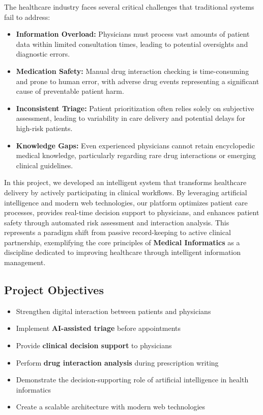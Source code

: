 \documentclass[12pt,a4paper]{article}
\begin{document}
The healthcare industry faces several critical challenges that traditional systems fail to address:
\begin{itemize}
    \item \textbf{Information Overload:} Physicians must process vast amounts of patient data within limited consultation times, leading to potential oversights and diagnostic errors.
    \item \textbf{Medication Safety:} Manual drug interaction checking is time-consuming and prone to human error, with adverse drug events representing a significant cause of preventable patient harm.
    \item \textbf{Inconsistent Triage:} Patient prioritization often relies solely on subjective assessment, leading to variability in care delivery and potential delays for high-risk patients.
    \item \textbf{Knowledge Gaps:} Even experienced physicians cannot retain encyclopedic medical knowledge, particularly regarding rare drug interactions or emerging clinical guidelines.
\end{itemize}

In this project, we developed an intelligent system that transforms healthcare delivery by actively participating in clinical workflows. By leveraging artificial intelligence and modern web technologies, our platform optimizes patient care processes, provides real-time decision support to physicians, and enhances patient safety through automated risk assessment and interaction analysis. This represents a paradigm shift from passive record-keeping to active clinical partnership, exemplifying the core principles of \textbf{Medical Informatics} as a discipline dedicated to improving healthcare through intelligent information management.

\subsection{Project Objectives}
\begin{itemize}[leftmargin=2cm]
    \item Strengthen digital interaction between patients and physicians
    \item Implement \textbf{AI-assisted triage} before appointments
    \item Provide \textbf{clinical decision support} to physicians
    \item Perform \textbf{drug interaction analysis} during prescription writing
    \item Demonstrate the decision-supporting role of artificial intelligence in health informatics
    \item Create a scalable architecture with modern web technologies
\end{itemize}
\end{document}
